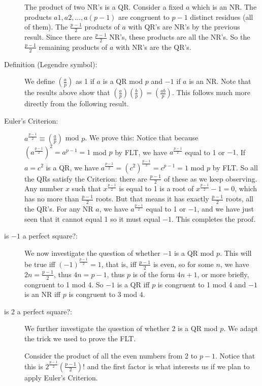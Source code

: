 \documentclass[12pt]{article}
\begin{document}
\begin{description}
The product of two NR's is a QR.  Consider a fixed $a$ which is an NR.   The products $a1, a2,\ldots,a(p-1)$  are congruent to $p-1$ distinct residues (all of them).   The $\frac{p-1}2$ products of $a$ with QR's are NR's
by the previous result.   Since there are $\frac{p-1}2$ NR's, these products are all the NR's.  So the  $\frac{p-1}2$ remaining products of $a$ with NR's are the QR's.

\item[Definition (Legendre symbol):]  We define $\left(\frac ap\right)$ as 1 if $a$ is a QR mod $p$ and $-1$ if $a$ is an NR.  Note that the results above show that $\left(\frac ap\right)\left(\frac bp\right)=\left(\frac {ab}p\right)$.   This follows much
more directly from the following result.

\item[Euler's Criterion:]  $a^{\frac{p-1}2}\equiv \left(\frac ap\right)$ mod $p$.   We prove this:  Notice that because $(a^{\frac{p-1}2})^2=a^{p-1}=1$ mod $p$ by FLT, we have $a^{\frac{p-1}2}$ equal to 1 or $-1$.   If
$a=c^2$ is a QR, we have $a^{\frac{p-1}2}=(c^2)^{\frac{p-1}2}=c^{p-1}=1$ mod $p$ by FLT.   So all the QRs satisfy the Criterion:  there are $\frac{p-1}2$ of these as we keep observing.   Any number $x$ such that $x^{\frac{p-1}2}$ is equal to 1
is a root of $x^{\frac{p-1}2}-1=0$, which has no more than $\frac{p-1}2$ roots.   But that means it has exactly $\frac{p-1}2$ roots, all the QR's.   For any NR $a$, we have $a^{\frac{p-1}2}$ equal to 1 or $-1$, and we have just seen that it cannot equal 1 so it must equal $-1$.   This completes the proof.

\item[is $-1$ a perfect square?: ]  We now investigate the question of whether $-1$ is a QR mod $p$.   This will be true iff $(-1)^{\frac{p-1}2}=1$, that is, iff $\frac{p-1}2$ is even, so for some $n$, we have $2n=\frac{p-1}2$, thus $4n=p-1$, thus $p$ is of the form $4n+1$, or more briefly, congruent to 1 mod 4.  So $-1$ is a QR iff $p$ is congruent to 1 mod 4 and $-1$ is an NR iff $p$ is congruent to 3 mod 4.

\item[is 2 a perfect square?:] We further investigate the question of whether 2 is a QR mod $p$.   We adapt the trick we used to prove the FLT.   

Consider the product of all the even numbers from 2 to $p-1$.   Notice that this is $2^{\frac{p-1}2}(\frac{p-1}2)!$ and the first
factor is what interests us if we plan to apply Euler's Criterion.  


\end{description}
\end{document}
